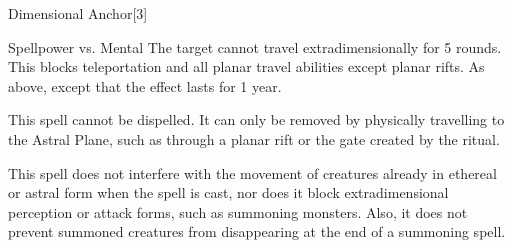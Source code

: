 \begin{spellsection}{Dimensional Anchor}[3]
    \begin{spellheader}
    \end{spellheader}
    \begin{spellcontent}
        \begin{spelltargetinginfo}
        \end{spelltargetinginfo}
        \begin{spelleffects}
            \begin{spellattack}{Spellpower vs. Mental}
                \spellsuccess  The target cannot travel extradimensionally for 5 rounds. This blocks teleportation and all planar travel abilities except planar rifts.
                \spellcritical As above, except that the effect lasts for 1 year.
            \end{spellattack}
        \end{spelleffects}
    \end{spellcontent}
    \begin{spellfooter}
        \spellnotes This spell cannot be dispelled. It can only be removed by physically travelling to the Astral Plane, such as through a planar rift or the gate created by the  ritual.

        This spell does not interfere with the movement of creatures already in ethereal or astral form when the spell is cast, nor does it block extradimensional perception or attack forms, such as summoning monsters. Also, it does not prevent summoned creatures from disappearing at the end of a summoning spell.
        \miscastrandom
    \end{spellfooter}
\end{spellsection}

